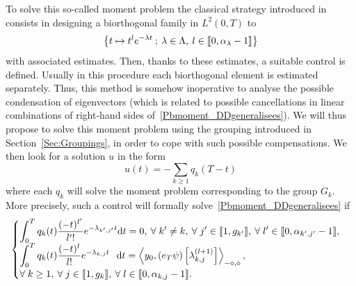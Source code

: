 \documentclass[AHL,Unicode,longabstracts]{cedram}
\newcommand{\llbracket}{\mathopen{[\mkern -2.7mu[}}
\newcommand{\rrbracket}{\mathclose{]\mkern -2.7mu]}}
\newcommand{\inter}[2]{\llbracket #1,#2 \rrbracket}
\newcommand{\dual}[2]{\left\langle #1, #2 \right\rangle_{-\diamond,\diamond}}
\newcommand{\n}{g}
\newcommand{\md}{\mathrm{d}}
\let\oldforall\forall
\renewcommand*{\forall}{\mathrel{\oldforall}}
\begin{document}
To solve this so-called moment problem the classical strategy introduced in~\cite{FattoriniRussell71} consists in designing a biorthogonal family in $L^2(0,T)$ to
\[
\left\{ t \mapsto t^l e^{-\lambda t} \: ; \: \lambda \in \Lambda, \: l \in \inter{0}{\alpha_\lambda -1} \right\}
\]
with associated estimates. Then, thanks to these estimates, a suitable control is defined. Usually in this procedure each biorthogonal element is estimated separately. Thus, this method is somehow inoperative to analyse the possible condensation of eigenvectors (which is related to possible cancellations in linear combinations of right-hand sides of~\eqref{Pbmoment_DDgeneralisees}). We will thus propose to solve this moment problem using the grouping introduced in Section~\ref{Sec:Groupings}, in order to cope with such possible compensations. We then look for a solution $u$ in the form
\begin{equation}\label{FormeControle}
u(t) = - \sum_{k \geq 1} q_k(T-t)
\end{equation}
where each $q_k$ will solve the moment problem corresponding to the group $G_k$. More precisely, such a control will formally solve~\eqref{Pbmoment_DDgeneralisees} if
\begin{equation}\label{Def:GBF_DD}
\begin{cases}
\displaystyle\int_0^T q_k(t) \frac{(-t)^{l'}}{l'!} e^{-\lambda_{k',j'} t} \md t = 0, \: \forall k' \neq k, \: \forall j'\in \inter{1}{\n_{k'}}, \: \forall l' \in \inter{0}{\alpha_{k',j'}-1},
\\[0.15em]
\displaystyle\int_0^T q_k(t) \frac{(-t)^l}{l!} e^{-\lambda_{k,j} t}\;\;\, \md t = \dual{y_0}{(e_T \psi) \left[\lambda_{k,j}^{(l+1)}\right] },
\\[0.15em]
\displaystyle\forall k \geq 1, \: \forall j \in \inter{1}{\n_k}, \: \forall l \in \inter{0}{\alpha_{k,j}-1}.
\end{cases}
\end{equation}
\end{document}
